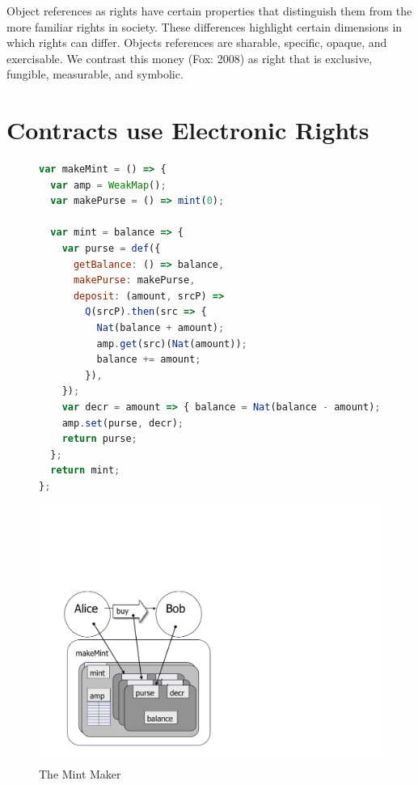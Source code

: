 \documentclass{llncs}
\begin{document}
Object references as rights have certain properties that distinguish them from the more familiar rights in society. These differences highlight certain dimensions in which rights can differ. Objects references are sharable, specific, opaque, and exercisable. We contrast this money (Fox: 2008) as right that is exclusive, fungible, measurable, and symbolic. 



\section{Contracts use Electronic Rights}

\begin{figure}[t]
\begin{minipage}[t]{0.48\linewidth}
\begin{lstlisting}[language=javascript]
var makeMint = () => {
  var amp = WeakMap();
  var makePurse = () => mint(0);
  
  var mint = balance => {
    var purse = def({
      getBalance: () => balance,
      makePurse: makePurse,
      deposit: (amount, srcP) =>
        Q(srcP).then(src => {
          Nat(balance + amount);
          amp.get(src)(Nat(amount)); 
          balance += amount;
        }),
    });
    var decr = amount => { balance = Nat(balance - amount); };
    amp.set(purse, decr);
    return purse;
  };
  return mint;
};
\end{lstlisting}
\end{minipage}
\begin{minipage}[t]{0.48\linewidth}
\vspace{0pt}
\includegraphics[scale=0.3]{bw-mint.pdf}
\end{minipage}
\caption{The Mint Maker}
\label{makeMint}
\end{figure}
\end{document}
